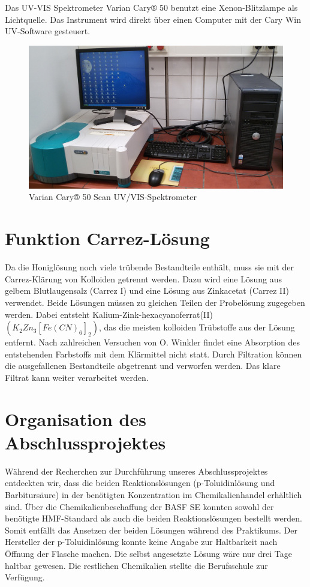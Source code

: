 Das UV-VIS Spektrometer Varian Cary® 50 benutzt eine Xenon-Blitzlampe als Lichtquelle. Das Instrument wird direkt über einen Computer mit der Cary Win UV-Software gesteuert. 
\begin{figure}[htbp]
    \centering
        \includegraphics[width=1.00\textwidth]{../Bilder/20150504_140611.jpg}
    \caption{Varian Cary® 50 Scan UV/VIS-Spektrometer}
    \label{fig:Spektrometer}
\end{figure}

\section{Funktion Carrez-Lösung}
Da die Honiglösung noch viele trübende Bestandteile enthält, muss sie mit der Carrez-Klärung von Kolloiden getrennt werden. Dazu wird eine Lösung aus gelbem Blutlaugensalz (Carrez I) und eine Lösung aus Zinkacetat (Carrez II) verwendet. Beide Lösungen müssen zu gleichen Teilen der Probelösung zugegeben werden. Dabei entsteht Kalium-Zink-hexacyanoferrat(II) $(K_{2}Zn_{3}[Fe(CN)_{6}]_{2})$, das die meisten kolloiden Trübstoffe aus der Lösung entfernt. Nach zahlreichen Versuchen von O. Winkler findet eine Absorption des entstehenden Farbstoffs mit dem Klärmittel nicht statt. Durch Filtration können die ausgefallenen Bestandteile abgetrennt und verworfen werden. Das klare Filtrat kann weiter verarbeitet werden.~\cite{Winkler}

\section{Organisation des Abschlussprojektes}
Während der Recherchen zur Durchführung unseres Abschlussprojektes entdeckten wir, dass die beiden Reaktionslösungen (p-Toluidinlösung und Barbitursäure) in der benötigten Konzentration im Chemikalienhandel erhältlich sind. Über die Chemikalienbeschaffung der BASF SE konnten sowohl der benötigte HMF-Standard als auch die beiden Reaktionslösungen bestellt werden. Somit entfällt das Ansetzen der beiden Lösungen während des Praktikums. Der Hersteller der p-Toluidinlösung konnte keine Angabe zur Haltbarkeit nach Öffnung der Flasche machen. Die selbst angesetzte Lösung wäre nur drei Tage haltbar gewesen. Die restlichen Chemikalien stellte die Berufsschule zur Verfügung.


